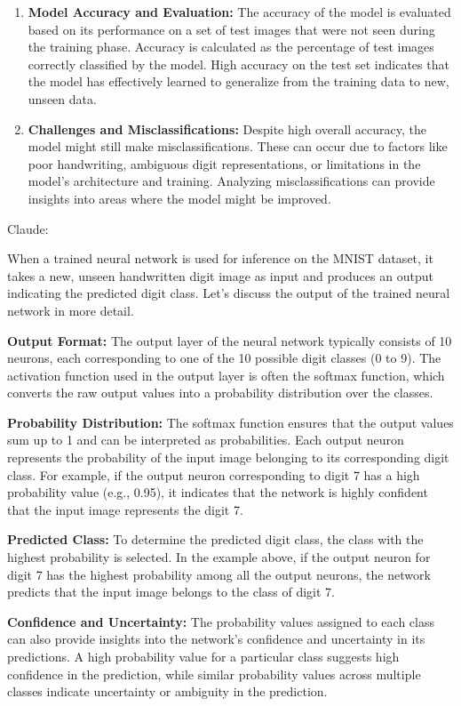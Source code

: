 \begin{enumerate}
    \item \textbf{Model Accuracy and Evaluation:}
    The accuracy of the model is evaluated based on its performance on a set of test images that were not seen during the training phase. Accuracy is calculated as the percentage of test images correctly classified by the model. High accuracy on the test set indicates that the model has effectively learned to generalize from the training data to new, unseen data.

    \item \textbf{Challenges and Misclassifications:}
    Despite high overall accuracy, the model might still make misclassifications. These can occur due to factors like poor handwriting, ambiguous digit representations, or limitations in the model's architecture and training. Analyzing misclassifications can provide insights into areas where the model might be improved.
\end{enumerate}

Claude:

When a trained neural network is used for inference on the MNIST dataset, it takes a new, unseen handwritten digit image as input and produces an output indicating the predicted digit class. Let's discuss the output of the trained neural network in more detail.

\textbf{Output Format:}
The output layer of the neural network typically consists of 10 neurons, each corresponding to one of the 10 possible digit classes (0 to 9). The activation function used in the output layer is often the softmax function, which converts the raw output values into a probability distribution over the classes.

\textbf{Probability Distribution:}
The softmax function ensures that the output values sum up to 1 and can be interpreted as probabilities. Each output neuron represents the probability of the input image belonging to its corresponding digit class. For example, if the output neuron corresponding to digit 7 has a high probability value (e.g., 0.95), it indicates that the network is highly confident that the input image represents the digit 7.

\textbf{Predicted Class:}
To determine the predicted digit class, the class with the highest probability is selected. In the example above, if the output neuron for digit 7 has the highest probability among all the output neurons, the network predicts that the input image belongs to the class of digit 7.

\textbf{Confidence and Uncertainty:}
The probability values assigned to each class can also provide insights into the network's confidence and uncertainty in its predictions. A high probability value for a particular class suggests high confidence in the prediction, while similar probability values across multiple classes indicate uncertainty or ambiguity in the prediction.

